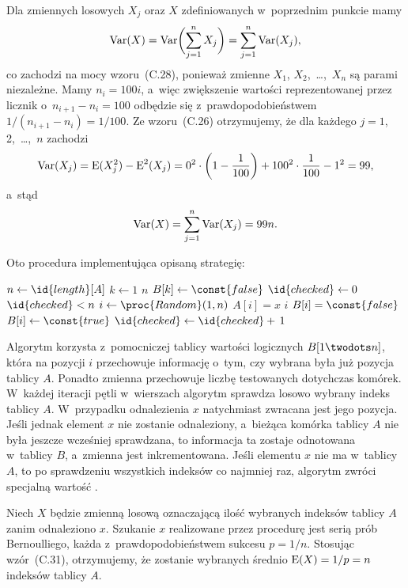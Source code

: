 \subproblem %
Dla zmiennych losowych $X_j$ oraz $X$ zdefiniowanych w~poprzednim punkcie mamy
\[
	\operatorname{Var}(X) = \operatorname{Var}\biggl(\sum_{j=1}^nX_j\biggr) = \sum_{j=1}^n\operatorname{Var}(X_j),
\]
co zachodzi na mocy wzoru~(C.28), ponieważ zmienne $X_1$, $X_2$,~\dots,~$X_n$ są parami niezależne. Mamy $n_i=100i$, a~więc zwiększenie wartości reprezentowanej przez licznik o~$n_{i+1}-n_i=100$ odbędzie się z~prawdopodobieństwem $1/(n_{i+1}-n_i)=1/100$. Ze wzoru~(C.26) otrzymujemy, że dla każdego $j=1$, 2,~\dots,~$n$ zachodzi
\[
	\operatorname{Var}(X_j) = \operatorname{E}(X_j^2)-\operatorname{E}^2(X_j) = 0^2\cdot\biggl(1-\frac{1}{100}\biggr)+100^2\cdot\frac{1}{100}-1^2 = 99,
\]
a~stąd
\[
	\operatorname{Var}(X) = \sum_{j=1}^n\operatorname{Var}(X_j) = 99n.
\]


\subproblem %
Oto procedura implementująca opisaną strategię:
\begin{codebox}
\li	$n\gets\id{length}[A]$
\li	\For $k\gets1$ \To $n$
\li		\Do $B[k]\gets\const{false}$
		\End
\li	$\id{checked}\gets0$
\li	\While $\id{checked}<n$ \label{li:random-search-while-begin}
\li		\Do
			$i\gets\proc{Random}(1,n)$
\li			\If $A[i]=x$
\li				\Then \Return $i$
				\End
\li			\If $B[i]=\const{false}$
\li				\Then
					$B[i]\gets\const{true}$
\li					$\id{checked}\gets\id{checked}+\,1$
				\End
		\End \label{li:random-search-while-end}
\li	\Return {}
\end{codebox}
Algorytm korzysta z~pomocniczej tablicy wartości logicznych $B[1\twodots n]$, która na pozycji $i$ przechowuje informację o~tym, czy wybrana była już  pozycja tablicy $A$. Ponadto zmienna  przechowuje liczbę testowanych dotychczas komórek. W~każdej iteracji pętli  w~wierszach \twodashes{\ref{li:random-search-while-begin}}{\ref{li:random-search-while-end}} algorytm sprawdza losowo wybrany indeks tablicy $A$. W~przypadku odnalezienia $x$ natychmiast zwracana jest jego pozycja. Jeśli jednak element $x$ nie zostanie odnaleziony, a~bieżąca komórka tablicy $A$ nie była jeszcze wcześniej sprawdzana, to informacja ta zostaje odnotowana w~tablicy $B$, a~zmienna  jest inkrementowana. Jeśli elementu $x$ nie ma w~tablicy $A$, to po sprawdzeniu wszystkich indeksów co najmniej raz, algorytm zwróci specjalną wartość .

\subproblem %
Niech $X$ będzie zmienną losową oznaczającą ilość wybranych indeksów tablicy $A$ zanim odnaleziono $x$. Szukanie $x$ realizowane przez procedurę  jest serią prób Bernoulliego, każda z~prawdopodobieństwem sukcesu $p=1/n$. Stosując wzór~(C.31), otrzymujemy, że zostanie wybranych średnio $\operatorname{E}(X)=1/p=n$ indeksów tablicy $A$.

